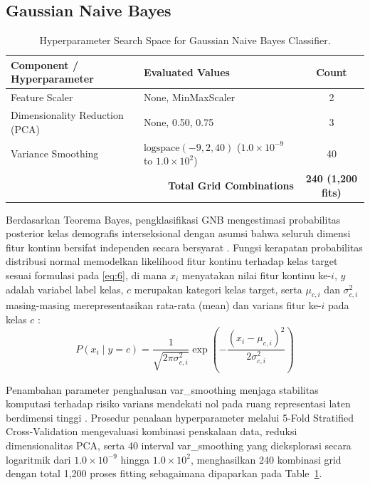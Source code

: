 \subsection{Gaussian Naive Bayes}
\label{sec:gaussian_naive_bayes}

\begin{table}[htbp]
\caption{Hyperparameter Search Space for Gaussian Naive Bayes Classifier.}
\label{tab:IV}
\centering
\begin{tabular}{llc}
\toprule
Component / Hyperparameter & Evaluated Values & Count \\
\midrule
Feature Scaler & None, MinMaxScaler & 2 \\
Dimensionality Reduction (PCA) & None, 0.50, 0.75 & 3 \\
Variance Smoothing & $\text{logspace}(-9, 2, 40)$ ($1.0 \times 10^{-9}$ to $1.0 \times 10^{2}$) & 40 \\
\midrule
\multicolumn{2}{r}{\textbf{Total Grid Combinations}} & \textbf{240 (1,200 fits)} \\
\bottomrule
\end{tabular}
\end{table}

Berdasarkan Teorema Bayes, pengklasifikasi GNB mengestimasi probabilitas posterior kelas demografis interseksional dengan asumsi bahwa seluruh dimensi fitur kontinu bersifat independen secara bersyarat \cite{ref35}. Fungsi kerapatan probabilitas distribusi normal memodelkan likelihood fitur kontinu terhadap kelas target sesuai formulasi pada \eqref{eq:6}, di mana $x_i$ menyatakan nilai fitur kontinu ke-$i$, $y$ adalah variabel label kelas, $c$ merupakan kategori kelas target, serta $\mu_{c,i}$ dan $\sigma_{c,i}^2$ masing-masing merepresentasikan rata-rata (mean) dan varians fitur ke-$i$ pada kelas $c$ \cite{ref35}:
\begin{equation}
P(x_i \mid y = c) = \frac{1}{\sqrt{2\pi\sigma_{c,i}^2}} \exp\left(-\frac{(x_i - \mu_{c,i})^2}{2\sigma_{c,i}^2}\right)
\label{eq:6}
\end{equation}

Penambahan parameter penghalusan var\_smoothing menjaga stabilitas komputasi terhadap risiko varians mendekati nol pada ruang representasi laten berdimensi tinggi \cite{ref36}. Prosedur penalaan hyperparameter melalui 5-Fold Stratified Cross-Validation mengevaluasi kombinasi penskalaan data, reduksi dimensionalitas PCA, serta 40 interval var\_smoothing yang dieksplorasi secara logaritmik dari $1.0 \times 10^{-9}$ hingga $1.0 \times 10^{2}$, menghasilkan 240 kombinasi grid dengan total 1,200 proses fitting sebagaimana dipaparkan pada Table~\ref{tab:IV}.
